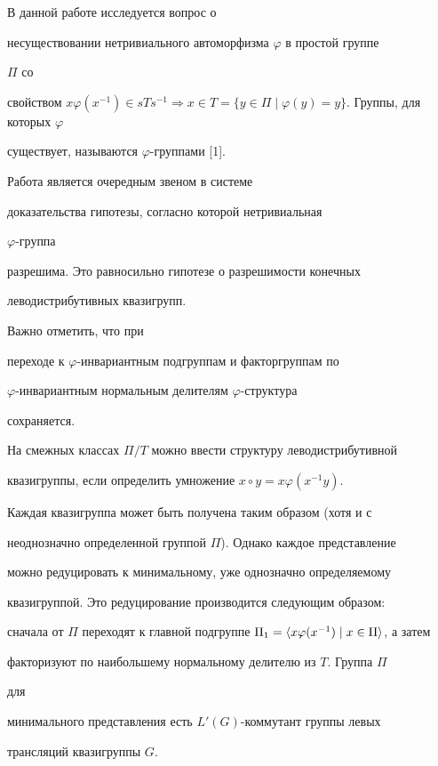  


 


В данной работе исследуется вопрос о 


несуществовании нетривиального автоморфизма $\varphi$ в простой группе 


$\Pi$ со 


свойством $x\varphi(x^{-1})\in s T s^{-1}\Rightarrow x\in T= 


\{y\in\Pi\mid\varphi(y)=y\}$. Группы, для которых $\varphi$ 


существует, называются $\varphi$-группами [1]. 


Работа является очередным звеном в системе 


доказательства гипотезы, согласно которой нетривиальная 


$\varphi$-группа 


разрешима. Это равносильно гипотезе о разрешимости конечных 


леводистрибутивных квазигрупп. 


Важно отметить, что при  


переходе к $\varphi$-инвариантным подгруппам и факторгруппам по 


$\varphi$-инвариантным нормальным делителям $\varphi$-структура 


сохраняется. 


 


На смежных классах $\Pi/T$ можно ввести структуру леводистрибутивной 


квазигруппы, если определить умножение $x\circ y=x\varphi(x^{-1}y)$. 


Каждая квазигруппа может быть получена таким образом (хотя и с  


неоднозначно определенной группой $\Pi$). Однако каждое представление  


можно редуцировать к минимальному, уже однозначно определяемому 


квазигруппой. Это редуцирование производится следующим образом: 


сначала от $\Pi$ переходят к главной подгруппе $\Pi_1=\la 


x\varphi(x^{-1})\mid x\in\Pi\ra$, а затем  


факторизуют по наибольшему нормальному делителю из $T$. Группа $\Pi$ 


для  


минимального представления есть $L'(G)$-коммутант группы левых  


трансляций квазигруппы $G$. 


